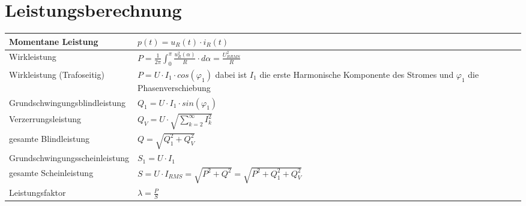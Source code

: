 \section{Leistungsberechnung}
\begin{tabu}{|p{0.3\textwidth}|p{0.6\textwidth}|}
  \hline
  Momentane Leistung
  	& $p(t) = u_{R}(t) \cdot i_{R}(t)$\\
  \hline
  Wirkleistung
  	& $P = \frac{1}{2\pi}\int_{0}^{\pi}\frac{u_{R}^2(\alpha)}{R} \cdot d\alpha = \frac{U_{R RMS}^2}{R}$\\
  \hline
  Wirkleistung (Trafoseitig)
  	& $P = U \cdot I_{1} \cdot cos(\varphi_{1})$ \newline
  		dabei ist $I_{1}$ die erste Harmonische Komponente des Stromes \newline
  		und $\varphi_{1}$ die Phasenverschiebung\\
  \hline
  Grundschwingungsblindleistung
  	& $Q_{1} = U \cdot I_{1} \cdot sin(\varphi_{1})$\\
  \hline
  Verzerrungsleistung
  	& $Q_{V} =  U \cdot \sqrt{\sum_{k = 2}^{\infty}I_{k}^2}$\\
  \hline
  gesamte Blindleistung
  	& $Q = \sqrt{Q_{1}^2 + Q_{V}^2}$\\
  \hline
  Grundschwingungsscheinleistung
  	& $S_{1} = U \cdot I_{1}$\\
  \hline
  gesamte Scheinleistung
  	& $S = U \cdot I_{RMS} = \sqrt{P^2 + Q^2} = \sqrt{P^2 + Q_{1}^2 + Q_{V}^2}$\\
  \hline
  Leistungsfaktor
  	& $\lambda = \frac{P}{S}$\\
  \hline
\end{tabu}